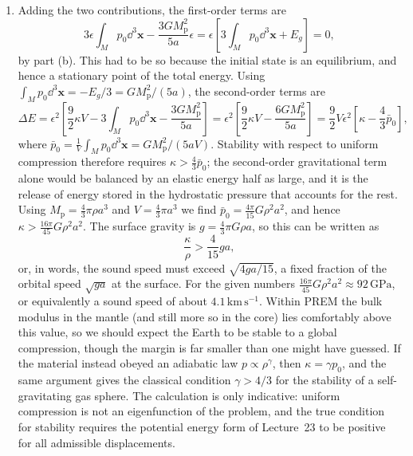 \documentclass[a4paper,10pt]{paper}
\begin{document}
\begin{enumerate}
\begin{enumerate}
so the shear modulus plays no role.
\item Adding the two contributions, the first-order terms are
\begin{equation*}
    3\epsilon\int_{M}p_{0}\dd^{3}\mathbf{x}-\frac{3GM_{\mathrm{p}}^{2}}{5a}\epsilon=\epsilon\left[3\int_{M}p_{0}\dd^{3}\mathbf{x}+E_{g}\right]=0,
\end{equation*}
by part (b). This had to be so because the initial state is an equilibrium, and hence a stationary point of the total energy. Using
$\int_{M}p_{0}\dd^{3}\mathbf{x}=-E_{g}/3=GM_{\mathrm{p}}^{2}/(5a)$, the second-order terms are
\begin{equation*}
    \Delta E=\epsilon^{2}\left[\frac{9}{2}\kappa V-3\int_{M}p_{0}\dd^{3}\mathbf{x}-\frac{3GM_{\mathrm{p}}^{2}}{5a}\right]
    =\epsilon^{2}\left[\frac{9}{2}\kappa V-\frac{6GM_{\mathrm{p}}^{2}}{5a}\right]=\frac{9}{2}V\epsilon^{2}\left[\kappa-\frac{4}{3}\bar{p}_{0}\right],
\end{equation*}
where $\bar{p}_{0}=\frac{1}{V}\int_{M}p_{0}\dd^{3}\mathbf{x}=GM_{\mathrm{p}}^{2}/(5aV)$. Stability with respect to uniform compression therefore
requires $\kappa>\tfrac{4}{3}\bar{p}_{0}$; the second-order gravitational term
alone would be balanced by an elastic energy half as large, and it is the release of energy stored in the hydrostatic pressure
that accounts for the rest. Using $M_{\mathrm{p}}=\tfrac{4}{3}\pi\rho a^{3}$ and $V=\tfrac{4}{3}\pi a^{3}$ we find $\bar{p}_{0}=\tfrac{4\pi}{15}G\rho^{2}a^{2}$,
and hence $\kappa>\tfrac{16\pi}{45}G\rho^{2}a^{2}$. The surface gravity is $g=\tfrac{4}{3}\pi G\rho a$, so this can be written as
\begin{equation*}
    \frac{\kappa}{\rho}>\frac{4}{15}ga,
\end{equation*}
or, in words, the sound speed must exceed $\sqrt{4ga/15}$, a fixed fraction of the orbital speed $\sqrt{ga}$ at the surface.
For the given numbers $\tfrac{16\pi}{45}G\rho^{2}a^{2}\approx 92\,\mathrm{GPa}$, or equivalently a sound speed of about $4.1\,\mathrm{km\,s^{-1}}$.
Within PREM the bulk modulus in the mantle (and still more so in the core) lies comfortably above this value, so we should
expect the Earth to be stable to a global compression, though the margin is far smaller than one might have guessed. If the
material instead obeyed an adiabatic law $p\propto\rho^{\gamma}$, then $\kappa=\gamma p_{0}$, and the same
argument gives the classical condition $\gamma>4/3$ for the stability of a self-gravitating gas sphere. The
calculation is only indicative: uniform compression is not an eigenfunction of the problem, and the true condition for stability
requires the potential energy form of Lecture~23 to be positive for all admissible displacements.
\end{enumerate}


\end{enumerate}
\end{document}
